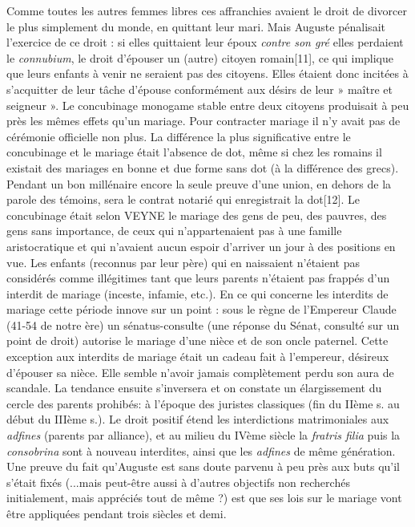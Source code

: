  Comme toutes les autres femmes libres ces affranchies avaient le droit de divorcer le plus simplement du monde, en quittant leur mari. Mais Auguste pénalisait l'exercice de ce droit : si elles quittaient leur époux \emph{contre son gré} elles perdaient le \emph{connubium}, le droit d'épouser un (autre) citoyen romain[11], ce qui implique que leurs enfants à venir ne seraient pas des citoyens. Elles étaient donc incitées à s'acquitter de leur tâche d'épouse conformément aux désirs de leur » maître et seigneur ».
 Le concubinage monogame stable entre deux citoyens produisait à peu près les mêmes effets qu'un mariage. Pour contracter mariage il n'y avait pas de cérémonie officielle non plus. La différence la plus significative entre le concubinage et le mariage était l'absence de dot, même si chez les romains il existait des mariages en bonne et due forme sans dot (à la différence des grecs). Pendant un bon millénaire encore la seule preuve d'une union, en dehors de la parole des témoins, sera le contrat notarié qui enregistrait la dot[12]. Le concubinage était selon VEYNE le mariage des gens de peu, des pauvres, des gens sans importance, de ceux qui n'appartenaient pas à une famille aristocratique et qui n'avaient aucun espoir d'arriver un jour à des positions en vue. Les enfants (reconnus par leur père) qui en naissaient n'étaient pas considérés comme illégitimes tant que leurs parents n'étaient pas frappés d'un interdit de mariage (inceste, infamie, etc.). 
 En ce qui concerne les interdits de mariage cette période innove sur un point : sous le règne de l'Empereur Claude (41-54 de notre ère) un sénatus-consulte (une réponse du Sénat, consulté sur un point de droit) autorise le mariage d'une nièce et de son oncle paternel. Cette exception aux interdits de mariage était un cadeau fait à l'empereur, désireux d'épouser sa nièce. Elle semble n'avoir jamais complètement perdu son aura de scandale. La tendance ensuite s'inversera et on constate un élargissement du cercle des parents prohibés: à l'époque des juristes classiques (fin du IIème s. au début du IIIème s.). Le droit positif étend les interdictions matrimoniales aux \emph{adfines} (parents par alliance), et au milieu du IVème siècle la \emph{fratris filia} puis la \emph{consobrina} sont à nouveau interdites, ainsi que les \emph{adfines} de même génération.
 Une preuve du fait qu'Auguste est sans doute parvenu à peu près aux buts qu'il s'était fixés (...mais peut-être aussi à d'autres objectifs non recherchés initialement, mais appréciés tout de même ?) est que ses lois sur le mariage vont être appliquées pendant trois siècles et demi. 
